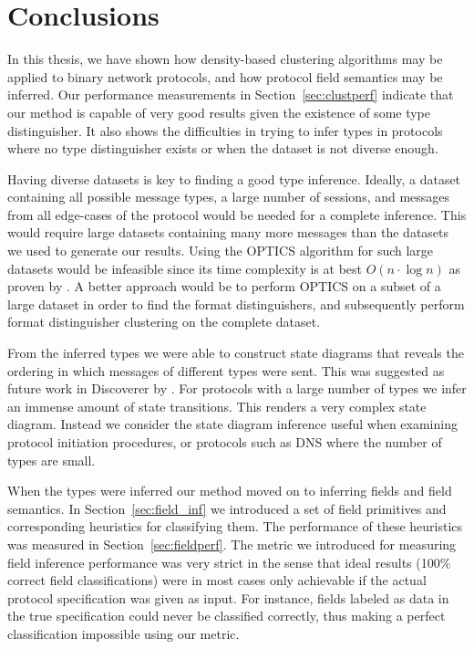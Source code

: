 \documentclass[a4paper]{report}
\begin{document}
\section{Conclusions}
In this thesis, we have shown how density-based clustering algorithms may be
applied to binary network protocols, and how protocol field semantics may be
inferred. Our performance measurements in Section~\ref{sec:clustperf} indicate
that our method is capable of very good results given the existence of some
type distinguisher. It also shows the difficulties in trying to infer types
in protocols where no type distinguisher exists or when the dataset is
not diverse enough.

Having diverse datasets is key to finding a good type inference. Ideally, a
dataset containing all possible message types, a large number of sessions,
and messages from all edge-cases of the protocol would be needed for a
complete inference. This would require large datasets containing many more
messages than the datasets we used to generate our results. Using the OPTICS
algorithm for such large datasets would be infeasible since its time
complexity is at best $O(n \cdot \log n)$ as proven by \citet{ankerst99}.
A better approach would be to perform OPTICS on a subset of a large dataset
in order to find the format distinguishers, and subsequently perform
format distinguisher clustering on the complete dataset.

From the inferred types we were able to construct state diagrams that reveals
the ordering in which messages of different types were sent. This was suggested
as future work in Discoverer by \citet{cui07}. For protocols with a large
number of types we infer an immense amount of state transitions. This renders
a very complex state diagram. Instead we consider the state diagram inference
useful when examining protocol initiation procedures, or protocols such as
DNS where the number of types are small.

When the types were inferred our method moved on to inferring fields and field
semantics. In Section~\ref{sec:field_inf} we introduced a set of
field primitives and corresponding heuristics for classifying them. The
performance of these heuristics was measured in Section~\ref{sec:fieldperf}.
The metric we introduced for measuring field inference performance was very
strict in the sense that ideal results (100\% correct field classifications)
were in most cases only achievable if the actual protocol specification was
given as input. For instance, fields labeled as data in the true specification
could never be classified correctly, thus making a perfect classification
impossible using our metric. 
\end{document}
